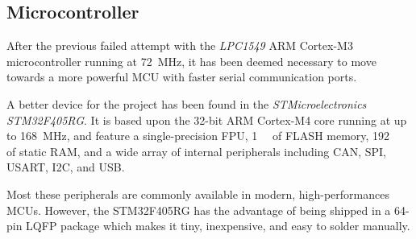 \subsection{Microcontroller}

After the previous failed attempt with the \emph{LPC1549} ARM Cortex-M3 microcontroller running at \SI{72}{\mega\hertz}, it has been deemed necessary to move towards a more powerful MCU with faster serial communication ports.

A better device for the project has been found in the \emph{STMicroelectronics STM32F405RG}.
It is based upon the 32-bit ARM Cortex-M4 core running at up to \SI{168}{\mega\hertz}, and feature a single-precision FPU, \SI{1}{\mega\byte} of FLASH memory, \SI{192}{\kilo\byte} of static RAM, and a wide array of internal peripherals including CAN, SPI, USART, I2C, and USB.

Most these peripherals are commonly available in modern, high-performances MCUs.
However, the STM32F405RG has the advantage of being shipped in a 64-pin LQFP package which makes it tiny, inexpensive, and easy to solder manually.
